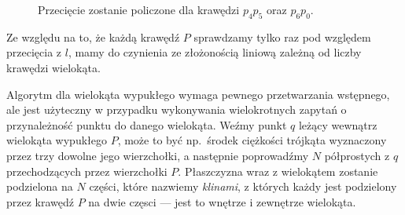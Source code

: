 \begin{itemize}
\begin{figure}[htp]
    \caption{Przecięcie zostanie policzone dla krawędzi $p_{4}p_{5}$
      oraz $p_{6}p_{0}$.}
  \end{figure}

\end{itemize}

Ze względu na to, że każdą krawędź $P$ sprawdzamy tylko raz
pod względem przecięcia z $l$, mamy do czynienia ze złożonością
liniową zależną od liczby krawędzi wielokąta.

Algorytm dla wielokąta wypukłego wymaga pewnego przetwarzania
wstępnego, ale jest użyteczny w przypadku wykonywania wielokrotnych
zapytań o przynależność punktu do danego wielokąta. Weźmy punkt $q$
leżący wewnątrz wielokąta wypukłego $P$, może to być np.\ środek
ciężkości trójkąta wyznaczony przez trzy dowolne jego wierzchołki,
a następnie poprowadźmy $N$ półprostych z $q$ przechodzących przez
wierzchołki $P$. Płaszczyzna wraz z wielokątem zostanie podzielona
na $N$ części, które nazwiemy \emph{klinami}, z których każdy jest
podzielony przez krawędź $P$ na dwie częsci --- jest to wnętrze
i zewnętrze wielokąta.

